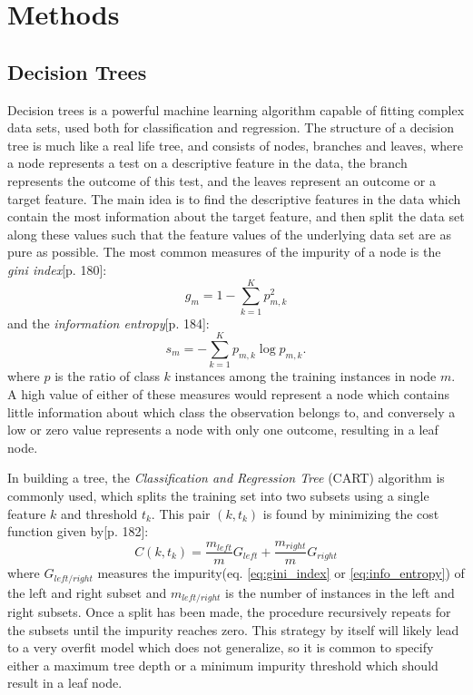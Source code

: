 \section{Methods}\label{sec:Methods}


\subsection{Decision Trees}
Decision trees is a powerful machine learning algorithm capable of fitting complex data sets, used both for classification and regression. The structure of a decision tree is much like a real life tree, and consists of nodes, branches and leaves, where a node represents a test on a descriptive feature in the data, the branch represents the outcome of this test, and the leaves represent an outcome or a target feature. The main idea is to find the descriptive features in the data which contain the most information about the target feature, and then split the data set along these values such that the feature values of the underlying data set are as pure as possible. The most common measures of the impurity of a node is the \textit{gini index}\cite{geron}[p. 180]:
\begin{equation}
\label{eq:gini_index}
    g_m = 1 - \sum_{k=1}^K p_{m, k}^2
\end{equation}
and the \textit{information entropy}\cite{geron}[p. 184]:
\begin{equation}
\label{eq:info_entropy}
    s_m = - \sum_{k=1}^K p_{m, k}\log{p_{m,k}}.
\end{equation}
where $p$ is the ratio of class $k$ instances among the training instances in node $m$. A high value of either of these measures would represent a node which contains little information about which class the observation belongs to, and conversely a low or zero value represents a node with only one outcome, resulting in a leaf node.

In building a tree, the \textit{Classification and Regression Tree} (CART) algorithm is commonly used, which splits the training set into two subsets using a single feature $k$ and threshold $t_k$. This pair $(k, t_k)$ is found by minimizing the cost function given by\cite{geron}[p. 182]:
\begin{equation}
    C(k, t_k) = \frac{m_{left}}{m}G_{left} + \frac{m_{right}}{m}G_{right}
\end{equation}
where $G_{left/right}$ measures the impurity(eq. \ref{eq:gini_index} or \ref{eq:info_entropy}) of the left and right subset and $m_{left/right}$ is the number of instances in the left and right subsets. Once a split has been made, the procedure recursively repeats for the subsets until the impurity reaches zero. This strategy by itself will likely lead to a very overfit model which does not generalize, so it is common to specify either a maximum tree depth or a minimum impurity threshold which should result in a leaf node.

